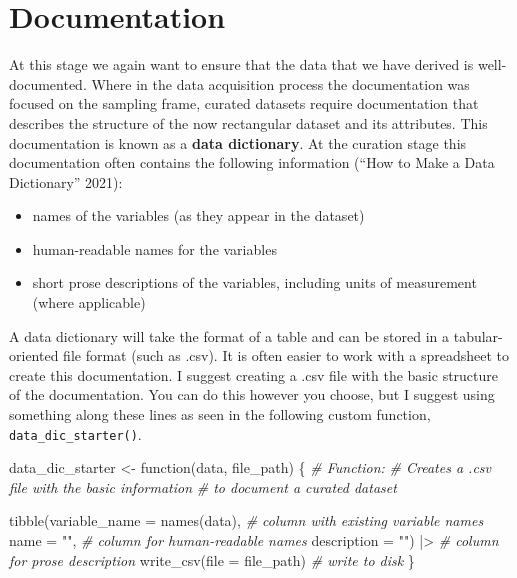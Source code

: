 \documentclass[
  letterpaper,
]{scrbook}
\newenvironment{Shaded}{\begin{snugshade}}{\end{snugshade}}
\newcommand{\AttributeTok}[1]{\textcolor[rgb]{0.00,0.00,0.00}{#1}}
\newcommand{\CommentTok}[1]{\textcolor[rgb]{0.00,0.00,0.00}{\textit{#1}}}
\newcommand{\ControlFlowTok}[1]{\textcolor[rgb]{0.00,0.00,0.00}{#1}}
\newcommand{\FunctionTok}[1]{\textcolor[rgb]{0.00,0.00,0.00}{#1}}
\newcommand{\NormalTok}[1]{\textcolor[rgb]{0.00,0.00,0.00}{#1}}
\newcommand{\OtherTok}[1]{\textcolor[rgb]{0.00,0.00,0.00}{#1}}
\newcommand{\SpecialCharTok}[1]{\textcolor[rgb]{0.00,0.00,0.00}{#1}}
\newcommand{\StringTok}[1]{\textcolor[rgb]{0.00,0.00,0.00}{#1}}
\providecommand{\tightlist}{%
  \setlength{\itemsep}{0pt}\setlength{\parskip}{0pt}}\usepackage{longtable,booktabs,array}
\begin{document}
\hypertarget{documentation-2}{%
\section{Documentation}\label{documentation-2}}

At this stage we again want to ensure that the data that we have derived
is well-documented. Where in the data acquisition process the
documentation was focused on the sampling frame, curated datasets
require documentation that describes the structure of the now
rectangular dataset and its attributes. This documentation is known as a
\textbf{data dictionary}. At the curation stage this documentation often
contains the following information ({``How to Make a Data Dictionary''}
2021):

\begin{itemize}
\tightlist
\item
  names of the variables (as they appear in the dataset)
\item
  human-readable names for the variables
\item
  short prose descriptions of the variables, including units of
  measurement (where applicable)
\end{itemize}

A data dictionary will take the format of a table and can be stored in a
tabular-oriented file format (such as .csv). It is often easier to work
with a spreadsheet to create this documentation. I suggest creating a
.csv file with the basic structure of the documentation. You can do this
however you choose, but I suggest using something along these lines as
seen in the following custom function, \texttt{data\_dic\_starter()}.

\begin{Shaded}
\begin{Highlighting}[]
\NormalTok{data\_dic\_starter }\OtherTok{\textless{}{-}} \ControlFlowTok{function}\NormalTok{(data, file\_path) \{}
  \CommentTok{\# Function:}
  \CommentTok{\# Creates a .csv file with the basic information}
  \CommentTok{\# to document a curated dataset}
  
  \FunctionTok{tibble}\NormalTok{(}\AttributeTok{variable\_name =} \FunctionTok{names}\NormalTok{(data), }\CommentTok{\# column with existing variable names }
       \AttributeTok{name =} \StringTok{""}\NormalTok{, }\CommentTok{\# column for human{-}readable names}
       \AttributeTok{description =} \StringTok{""}\NormalTok{) }\SpecialCharTok{|\textgreater{}} \CommentTok{\# column for prose description}
  \FunctionTok{write\_csv}\NormalTok{(}\AttributeTok{file =}\NormalTok{ file\_path) }\CommentTok{\# write to disk}
\NormalTok{\}}
\end{Highlighting}
\end{Shaded}
\end{document}

